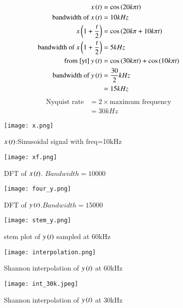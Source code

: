 \documentclass[journal,12pt,twocolumn]{IEEEtran}
\begin{document}
\begin{align}
  x\left(t\right)&=\cos{\ensuremath{\left(20k\pi t\right)}}\\
    \text{bandwidth of } x\left(t\right) &= 10 kHz\\
    x\left(1+\frac{t}{2}\right) &= \cos{\ensuremath{\left(20k\pi+10k\pi t\right)}}\\
    \text{bandwidth of } x\left(1+\frac{t}{2}\right) &=  5 kHz\\
    \text{from \eqref{yt} } 
    y\left(t\right)&= \cos{\ensuremath{\left(30k\pi t\right)}}+\cos{\ensuremath{\left(10k\pi t\right)}}\\
    \text{bandwidth of } y\left(t\right) &= \frac{30}{2} kHz\\
    &= 15 kHz
\end{align}
\begin{align}
    \text{Nyquist rate} &= 2 \times \text{maximum frequency}\\
    &= 30 kHz
\end{align}
\begin{figure}[!h]
 \centering
 \texttt{[image: x.png]}
 \caption{$x\left(t\right)$:Sinusoidal signal with freq=10kHz}
\end{figure}
\begin{figure}[!h]
 \centering
 \texttt{[image: xf.png]}
 \caption{DFT of $x\left(t\right)$. $Bandwidth=10000$}
\end{figure}
\begin{figure}[!h]
 \centering
 \texttt{[image: four\_y.png]}
 \caption{DFT of $y\left(t\right)$.$Bandwidth=15000$}
\end{figure}
\begin{figure}[!h]
 \centering
 \texttt{[image: stem\_y.png]}
 \caption{stem plot of $y\left(t\right)$ sampled at 60kHz}
\end{figure}
\begin{figure}[!h]
 \centering
 \texttt{[image: interpolation.png]}
 \caption{Shannon interpolation of $y\left(t\right)$ at 60kHz} 
\end{figure}
\begin{figure}[!h]
 \centering
 \texttt{[image: int\_30k.jpeg]}
 \caption{Shannon interpolation of $y\left(t\right)$ at 30kHz}
\end{figure}
\end{document}
